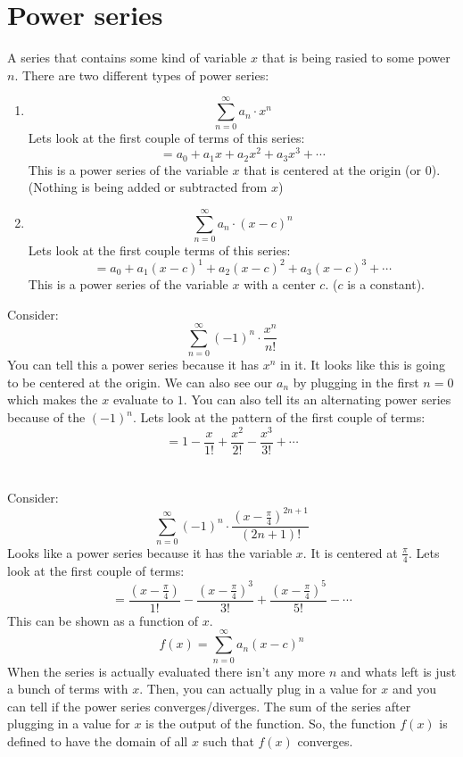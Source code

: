 \documentclass{article}
\begin{document}
\section{Power series}
    A series that contains some kind of variable \(x\) that is being rasied to some power \(n\).
    There are two different types of power series:
    \begin{enumerate}
        \item \[\sum_{n=0}^{\infty} a_n \cdot x^n\]
        Lets look at the first couple of terms of this series:
        \[= a_0 + a_1 x + a_2 x^2 + a_3 x^3 + \cdots\]
        This is a power series of the variable \(x\) that is centered at the origin (or 0).
        (Nothing is being added or subtracted from \(x\))
        \item \[\sum_{n = 0}^{\infty} a_n \cdot (x-c)^n \]
        Lets look at the first couple terms of this series:
        \[= a_0 + a_1 (x-c)^1 + a_2(x-c)^2 + a_3(x-c)^3 + \cdots\]
        This is a power series of the variable \(x\) with a center \(c\). 
        (\(c\) is a constant).
    \end{enumerate}
    Consider:
    \[\sum_{n = 0}^{\infty} (-1)^n \cdot \frac{x^n}{n!} \]
    You can tell this a power series because it has \(x^n\) in it.
    It looks like this is going to be centered at the origin.
    We can also see our \(a_n\) by plugging in the first \(n=0\) which makes the \(x\) evaluate to \(1\).
    You can also tell its an alternating power series because of the \((-1)^n\).
    Lets look at the pattern of the first couple of terms:
    \[= 1 - \frac{x}{1!} + \frac{x^2}{2!} - \frac{x^3}{3!} + \cdots\]\\
    \\
    Consider:
    \[\sum_{n=0}^{\infty} (-1)^n \cdot \frac{(x - \frac{\pi}{4})^{2n+1}}{(2n+1)!}\]
    Looks like a power series because it has the variable \(x\).
    It is centered at \(\frac{\pi}{4}\).
    Lets look at the first couple of terms:
    \[= \frac{(x - \frac{\pi}{4})}{1!} - \frac{(x - \frac{\pi}{4})^3}{3!} + \frac{(x - \frac{\pi}{4})^5}{5!} - \cdots\]
    This can be shown as a function of \(x\).
    \[f(x) = \sum_{n = 0}^{\infty} a_n (x - c)^n\]
    When the series is actually evaluated there isn't any more \(n\) and whats left is just a bunch of terms with \(x\).
    Then, you can actually plug in a value for \(x\) and you can tell if the power series converges/diverges.
    The sum of the series after plugging in a value for \(x\) is the output of the function.
    So, the function \(f(x)\) is defined to have the domain of all \(x\) such that \(f(x)\) converges.
\end{document}
